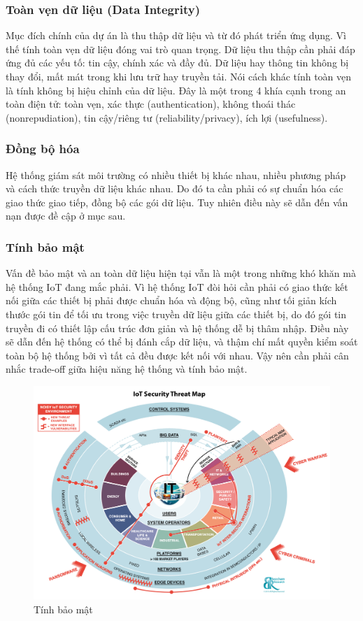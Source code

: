 \subsubsection*{Toàn vẹn dữ liệu (Data Integrity)} Mục đích chính của dự án là thu thập dữ liệu và từ đó phát triển ứng dụng. Vì thế tính toàn vẹn dữ liệu đóng vai trò quan trọng. Dữ liệu thu thập cần phải đáp ứng đủ các yếu tố: tin cậy, chính xác và đầy đủ. Dữ liệu hay thông tin không bị thay đổi, mất mát trong khi lưu trữ hay truyền tải. Nói cách khác tính toàn vẹn là tính không bị hiệu chỉnh của dữ liệu. Đây là một trong 4 khía cạnh trong an toàn điện tử: toàn vẹn, xác thực (authentication), không thoái thác (nonrepudiation), tin cậy/riêng tư (reliability/privacy), ích lợi (usefulness).

\subsubsection*{Đồng bộ hóa} Hệ thống giám sát môi trường có nhiều thiết bị khác nhau, nhiều phương pháp và cách thức truyền dữ liệu khác nhau. Do đó ta cần phải có sự chuẩn hóa các giao thức giao tiếp, đồng bộ các gói dữ liệu. Tuy nhiên điều này sẽ dẫn đến vấn nạn được đề cập ở mục sau.

\subsubsection*{Tính bảo mật} Vấn đề bảo mật và an toàn dữ liệu hiện tại vẫn là một trong những khó khăn mà hệ thống IoT đang mắc phải. Vì hệ thống IoT đòi hỏi cần phải có giao thức kết nối giữa các thiết bị phải được chuẩn hóa và động bộ, cũng như tối giản kích thước gói tin để tối ưu trong việc truyền dữ liệu giữa các thiết bị, do đó gói tin truyền đi có thiết lập cấu trúc đơn giản và hệ thống dễ bị thâm nhập. Điều này sẽ dẫn đến hệ thống có thể bị đánh cắp dữ liệu, và thậm chí mất quyền kiểm soát toàn bộ hệ thống bởi vì tất cả đều được kết nối với nhau. Vậy nên cần phải cân nhắc trade-off giữa hiệu năng hệ thống và tính bảo mật.
\begin{figure}[H]
	\centering    
	\includegraphics[width=5in]{virusiot}
	\caption[Tính bảo mật]{Tính bảo mật}
	\label{fig:virusiot}
\end{figure}

